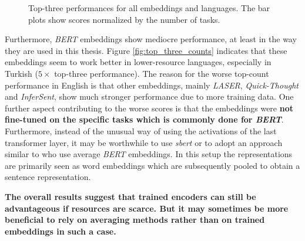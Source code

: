 \begin{figure}
  	\begin{center}
    		
  	\end{center}
  	\caption[Top-three performances for all embeddings and languages]
  	{Top-three performances for all embeddings and languages. The bar plots show scores normalized by the number of tasks.}
	\label{fig:top_three_counts}
\end{figure}

Furthermore, \textit{BERT} embeddings show mediocre performance, at least in the way they are used in this thesis. Figure \vref{fig:top_three_counts} indicates that these embeddings seem to work better in lower-resource languages, especially in Turkish ($5\times$ top-three performance). The reason for the worse top-count performance in English is that other embeddings, mainly \textit{LASER}, \textit{Quick-Thought} and \textit{InferSent}, show much stronger performance due to more training data. One further aspect contributing to the worse scores is that the embeddings were \textbf{not fine-tuned on the specific tasks which is commonly done for \textit{BERT}}. Furthermore, instead of the unusual way of using the activations of the last transformer layer, it may be worthwhile to use \textit{\gls{sbert}} \citep{Reimers.2019} or to adopt an approach similar to \citep{Krasnowska.2019} who use average \textit{BERT} embeddings. In this setup the representations are primarily seen as word embeddings which are subsequently pooled to obtain a sentence representation.

\textbf{The overall results suggest that trained encoders can still be advantageous if resources are scarce. But it may sometimes be more beneficial to rely on averaging methods rather than on trained embeddings in such a case.}

